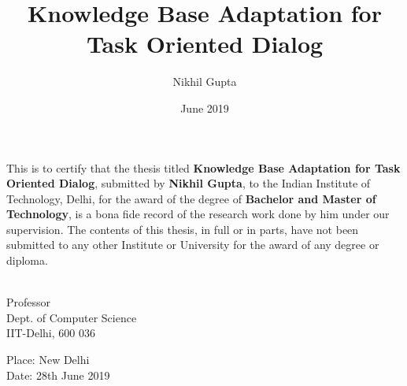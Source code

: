 \documentclass[Dual]{iitddiss}
\begin{document}


\title{Knowledge Base Adaptation for Task Oriented Dialog}

\author{Nikhil Gupta}
\date{June 2019}

\maketitle

\certificate

\vspace*{0.5in}

\noindent This is to certify that the thesis titled {\bf Knowledge Base Adaptation for Task Oriented Dialog}, submitted by {\bf Nikhil Gupta},
  to the Indian Institute of Technology, Delhi, for
the award of the degree of {\bf Bachelor and Master of Technology}, is a bona fide
record of the research work done by him under our supervision.  The
contents of this thesis, in full or in parts, have not been submitted
to any other Institute or University for the award of any degree or
diploma.

\vspace*{1.5in}

\begin{singlespacing}
\hspace*{-0.25in}
\parbox{2.5in}{
 \\
\noindent Professor \\
\noindent Dept. of Computer Science\\
\noindent IIT-Delhi, 600 036 \\
}
\hspace*{1.0in}
\end{singlespacing}
\vspace*{0.25in}
\noindent Place: New Delhi\\
Date: 28th June 2019


\acknowledgements

\pagebreak

\end{document}
